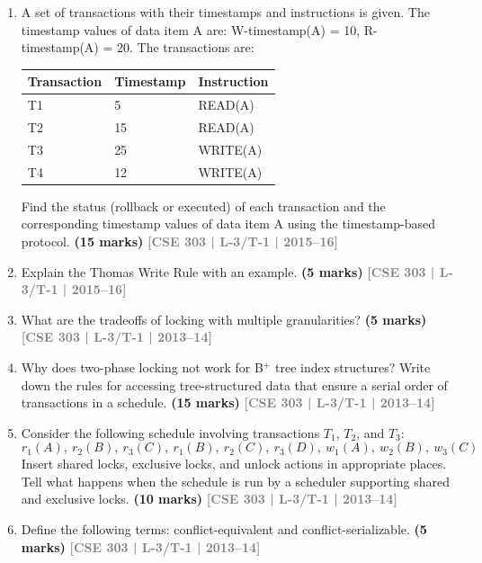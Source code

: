 \documentclass[12pt,a3paper]{article}
\newcommand{\yr}[1]{\hfill\textcolor{gray}{\small\textbf{[#1]}}}
\newcommand{\mk}[1]{\textcolor{orange!70!black}{\small\textbf{(#1 marks)}}}
\begin{document}
\begin{enumerate}
\item A set of transactions with their timestamps and instructions is given. The timestamp values of data item A are: W-timestamp(A) = 10, R-timestamp(A) = 20. The transactions are:

\medskip
\begin{center}
\begin{tabular}{lll}
\toprule
\textbf{Transaction} & \textbf{Timestamp} & \textbf{Instruction}\\
\midrule
T1 & 5 & READ(A)\\
T2 & 15 & READ(A)\\
T3 & 25 & WRITE(A)\\
T4 & 12 & WRITE(A)\\
\bottomrule
\end{tabular}
\end{center}

Find the status (rollback or executed) of each transaction and the corresponding timestamp values of data item A using the timestamp-based protocol.
\mk{15} \yr{CSE 303 | L-3/T-1 | 2015--16}

\item Explain the Thomas Write Rule with an example.
\mk{5} \yr{CSE 303 | L-3/T-1 | 2015--16}

\item What are the tradeoffs of locking with multiple granularities?
\mk{5} \yr{CSE 303 | L-3/T-1 | 2013--14}

\item Why does two-phase locking not work for B$^+$ tree index structures? Write down the rules for accessing tree-structured data that ensure a serial order of transactions in a schedule.
\mk{15} \yr{CSE 303 | L-3/T-1 | 2013--14}

\item Consider the following schedule involving transactions $T_1$, $T_2$, and $T_3$:
\[r_1(A),\ r_2(B),\ r_3(C),\ r_1(B),\ r_2(C),\ r_3(D),\ w_1(A),\ w_2(B),\ w_3(C)\]
Insert shared locks, exclusive locks, and unlock actions in appropriate places. Tell what happens when the schedule is run by a scheduler supporting shared and exclusive locks.
\mk{10} \yr{CSE 303 | L-3/T-1 | 2013--14}

\item Define the following terms: conflict-equivalent and conflict-serializable.
\mk{5} \yr{CSE 303 | L-3/T-1 | 2013--14}


\end{enumerate}
\end{document}

